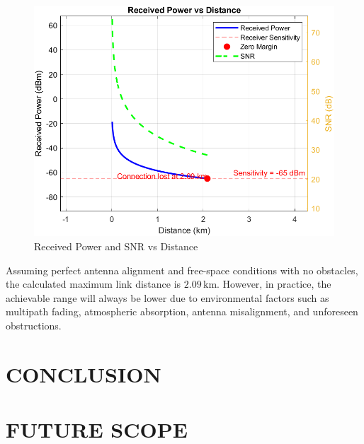 \documentclass[letterpaper, 10 pt, conference]{ieeeconf}  %
\begin{document}
\begin{figure}[htbp]
    \centering
    \includegraphics[width=0.75\linewidth]{figures/snr.png}
    \caption{Received Power and SNR vs Distance}
    \label{fig:placeholder}
\end{figure}

Assuming perfect antenna alignment and free-space conditions with no obstacles, the calculated maximum link distance is $2.09 \,\text{km}$. However, in practice, the achievable range will always be lower due to 
environmental factors such as multipath fading, atmospheric absorption, 
antenna misalignment, and unforeseen obstructions. 


\section{CONCLUSION}

\section{FUTURE SCOPE}


\addtolength{\textheight}{-12cm}   %

\end{document}
